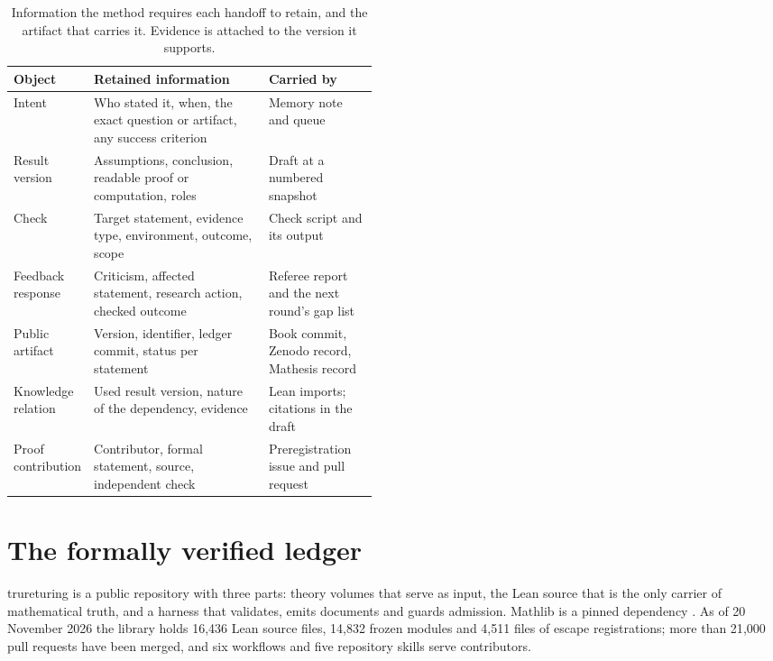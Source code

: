 \documentclass[11pt]{article}
\begin{document}
\begin{table}[htbp]
\centering\small
\caption{Information the method requires each handoff to retain, and the
artifact that carries it. Evidence is attached to the version it supports.}
\label{tab:records}
\begin{tabularx}{\linewidth}{@{}>{\raggedright\arraybackslash}p{0.17\linewidth}>{\raggedright\arraybackslash}X>{\raggedright\arraybackslash}p{0.3\linewidth}@{}}
\toprule
Object & Retained information & Carried by \\
\midrule
Intent & Who stated it, when, the exact question or artifact, any success criterion & Memory note and queue \\
Result version & Assumptions, conclusion, readable proof or computation, roles & Draft at a numbered snapshot \\
Check & Target statement, evidence type, environment, outcome, scope & Check script and its output \\
Feedback response & Criticism, affected statement, research action, checked outcome & Referee report and the next round's gap list \\
Public artifact & Version, identifier, ledger commit, status per statement & Book commit, Zenodo record, Mathesis record \\
Knowledge relation & Used result version, nature of the dependency, evidence & Lean imports; citations in the draft \\
Proof contribution & Contributor, formal statement, source, independent check & Preregistration issue and pull request \\
\bottomrule
\end{tabularx}
\end{table}

\section{The formally verified ledger}
\label{sec:ledger}
trureturing \citep{trureturingrepo} is a public repository with three parts:
theory volumes that serve as input, the Lean source that is the only carrier
of mathematical truth, and a harness that validates, emits documents and
guards admission. Mathlib is a pinned dependency \citep{mathlib}. As of 20
November 2026 the library holds 16{,}436 Lean source files, 14{,}832 frozen
modules and 4{,}511 files of escape registrations; more than 21{,}000 pull
requests have been merged, and six workflows and five repository skills
serve contributors.
\end{document}
